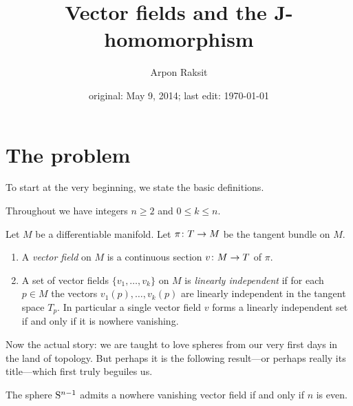 



\title{Vector fields and the J-homomorphism}
\author{Arpon Raksit}
\date{original: May 9, 2014; last edit: \today}


\maketitle
\thispagestyle{fancy}


\section{The problem}

To start at the very beginning, we state the basic definitions.

\begin{notation}
  \label{ints}
  Throughout we have integers $n \ge 2$ and $0 \le k \le n$.
\end{notation}

\begin{definitions}
  \label{vfield-dfn}
  Let $M$ be a differentiable manifold. Let $\pi \c T \to M$ be the
  tangent bundle on $M$.
  \begin{enumerate}
  \item A \emph{vector field} on $M$ is a continuous section $v \c M
    \to T$ of $\pi$.
  \item A set of vector fields $\{v_1,\ldots,v_k\}$ on $M$ is
    \emph{linearly independent} if for each $p \in M$ the vectors
    $v_1(p),\ldots,v_k(p)$ are linearly independent in the tangent
    space $T_p$. In particular a single vector field $v$ forms a
    linearly independent set if and only if it is nowhere vanishing.
  \end{enumerate}
\end{definitions}

Now the actual story: we are taught to love spheres from our very
first days in the land of topology. But perhaps it is the following
result---or perhaps really its title---which first truly beguiles us.

\begin{theorem}
  \label{hairy-ball}
  The sphere $\S^{n-1}$ admits a nowhere vanishing vector field if and
  only if $n$ is even.
\end{theorem}


